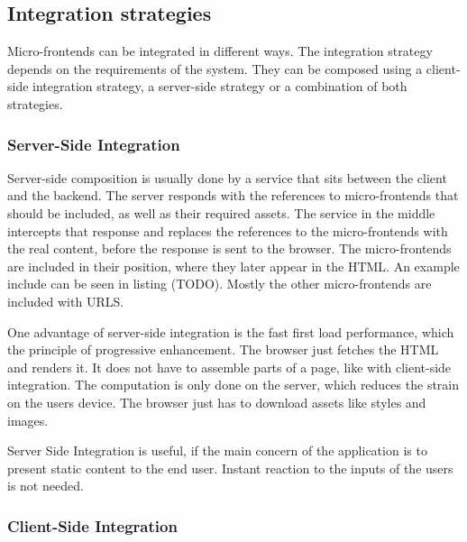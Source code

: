 \subsection{Integration strategies}

Micro-frontends can be integrated in different ways. The integration strategy depends on the requirements of the system. They can be composed using a client-side integration strategy, a server-side strategy or a combination of both strategies.

\subsubsection{Server-Side Integration}

Server-side composition is usually done by a service that sits between the client and the backend. \cite{book:2020:geers:background:micro-frontends:micro-frontends-in-action} The server responds with the references to micro-frontends that should be included, as well as their required assets. The service in the middle intercepts that response and replaces the references to the micro-frontends with the real content, before the response is sent to the browser. The micro-frontends are included in their position, where they later appear in the HTML. An example include can be seen in listing (TODO). Mostly the other micro-frontends are included with URLS.


One advantage of server-side integration is the fast first load performance, which the principle of progressive enhancement. \cite{book:2010:parker:background:micro-frontends:designing-with-progressive-enhancement} The browser just fetches the HTML and renders it. It does not have to assemble parts of a page, like with client-side integration. The computation is only done on the server, which reduces the strain on the users device. \cite{book:2020:geers:background:micro-frontends:micro-frontends-in-action} The browser just has to download assets like styles and images. 


Server Side Integration is useful, if the main concern of the application is to present static content to the end user. Instant reaction to the inputs of the users is not needed. \cite{book:2020:geers:background:micro-frontends:micro-frontends-in-action}

\subsubsection{Client-Side Integration}

